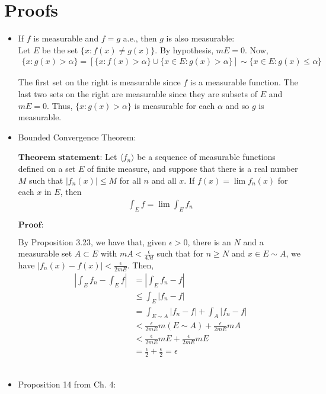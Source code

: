 \documentclass[12pt]{article}
\begin{document}
\newpage
\section{Proofs}

\begin{itemize}

\item If $f$ is measurable and $f = g$ a.e., then $g$ is also measurable:\\

Let $E$ be the set $\{x: f(x) \neq g(x)\}$. By hypothesis, $mE = 0$. Now,
\begin{align*}
\{x: g(x) > \alpha\} = \left[\{x: f(x) > \alpha\} \cup \{x \in E: g(x) > \alpha\}\right] \sim \{x \in E: g(x) \leq \alpha\}
\end{align*}

The first set on the right is measurable since $f$ is a measurable function. The last two sets on the right are measurable since they are subsets of $E$ and $mE = 0$. Thus, $\{x: g(x) > \alpha\}$ is measurable for each $\alpha$ and so $g$ is measurable.
\\
\item Bounded Convergence Theorem:

$\textbf{Theorem statement:}$ Let $\langle f_n \rangle$ be a sequence of measurable functions defined on a set $E$ of finite measure, and suppose that there is a real number $M$ such that $|f_n(x)| \leq M$ for all $n$ and all $x$. If $f(x) = \lim f_n(x)$ for each $x$ in $E$, then
\begin{align*}
\int_E f = \lim \int_E f_n
\end{align*}

$\textbf{Proof:}$

By Proposition 3.23, we have that, given $\epsilon > 0$, there is an $N$ and a measurable set $A \subset E$ with $mA < \frac{\epsilon}{4M}$ such that for $n \geq N$ and $x \in E \sim A$, we have $|f_n(x) - f(x)| < \frac{\epsilon}{2mE}$. Then,
\begin{align*}
\left|\int_E f_n - \int_E f\right| &= \left|\int_E f_n - f\right|\\
&\leq \int_E \left|f_n - f\right|\\
&= \int_{E \sim A} \left|f_n - f\right| + \int_A \left|f_n - f\right|\\
&< \frac{\epsilon}{2mE}m(E \sim A) + \frac{\epsilon}{2mE}mA\\
&< \frac{\epsilon}{2mE}mE + \frac{\epsilon}{2mE}mE\\
&= \frac{\epsilon}{2} + \frac{\epsilon}{2} = \epsilon 
\end{align*}
\\
\item Proposition 14 from Ch. 4:


\end{itemize}
\end{document}
